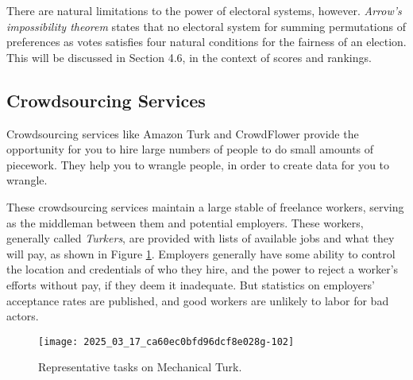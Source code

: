\documentclass[10pt]{article}
\begin{document}
There are natural limitations to the power of electoral systems, however. \textit{Arrow’s impossibility theorem} states that no electoral system for summing permutations of preferences as votes satisfies four natural conditions for the fairness of an election. This will be discussed in Section 4.6, in the context of scores and rankings.

\subsection{Crowdsourcing Services}
Crowdsourcing services like Amazon Turk and CrowdFlower provide the opportunity for you to hire large numbers of people to do small amounts of piecework. They help you to wrangle people, in order to create data for you to wrangle.

These crowdsourcing services maintain a large stable of freelance workers, serving as the middleman between them and potential employers. These workers, generally called \textit{Turkers}, are provided with lists of available jobs and what they will pay, as shown in Figure \ref{fig:mechanical-turk}. Employers generally have some ability to control the location and credentials of who they hire, and the power to reject a worker's efforts without pay, if they deem it inadequate. But statistics on employers' acceptance rates are published, and good workers are unlikely to labor for bad actors.

\begin{figure}[h]
\centering
\texttt{[image: 2025\_03\_17\_ca60ec0bfd96dcf8e028g-102]}
\caption{Representative tasks on Mechanical Turk.}
\label{fig:mechanical-turk}
\end{figure}
\end{document}
